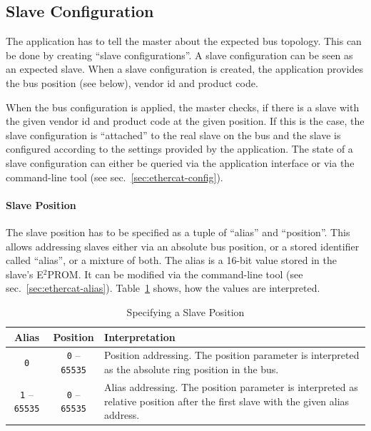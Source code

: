 \documentclass[a4paper,12pt,BCOR6mm,bibtotoc,idxtotoc]{scrbook}
\begin{document}
\subsection{Slave Configuration}

The application has to tell the master about the expected bus topology. This
can be done by creating ``slave configurations''. A slave configuration can be
seen as an expected slave. When a slave configuration is created, the
application provides the bus position (see below), vendor id and product code.

When the bus configuration is applied, the master checks, if there is a slave
with the given vendor id and product code at the given position. If this is
the case, the slave configuration is ``attached'' to the real slave on the bus
and the slave is configured according to the settings provided by the
application. The state of a slave configuration can either be queried via the
application interface or via the command-line tool (see
sec.~\ref{sec:ethercat-config}).

\paragraph{Slave Position} The slave position has to be specified as a tuple
of ``alias'' and ``position''. This allows addressing slaves either via an
absolute bus position, or a stored identifier called ``alias'', or a mixture
of both. The alias is a 16-bit value stored in the slave's E$^2$PROM. It can
be modified via the command-line tool (see sec.~\ref{sec:ethercat-alias}).
Table~\ref{tab:slaveposition} shows, how the values are interpreted.

\begin{table}[htbp]
  \centering
  \caption{Specifying a Slave Position}
  \label{tab:slaveposition}
  \vspace{2mm}
  \begin{tabular}{c|c|p{70mm}}
    Alias & Position & Interpretation\\
    \hline

    \lstinline+0+ & \lstinline+0+ -- \lstinline+65535+ &

    Position addressing. The position parameter is interpreted as the absolute
    ring position in the bus.\\ \hline

    \lstinline+1+ -- \lstinline+65535+ & \lstinline+0+ -- \lstinline+65535+ &

    Alias addressing. The position parameter is interpreted as relative
    position after the first slave with the given alias address. \\ \hline

  \end{tabular}
\end{table}
\end{document}
